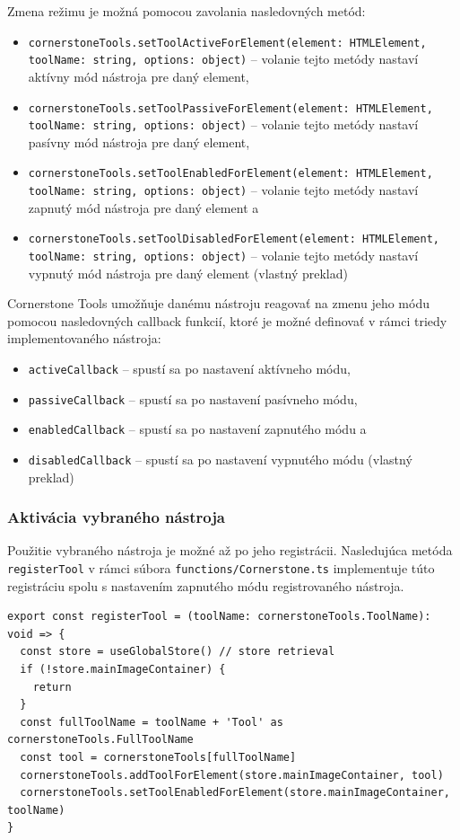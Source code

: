 Zmena režimu je možná pomocou zavolania nasledovných metód:
\begin {itemize}
\item {\texttt{cornerstoneTools.setToolActiveForElement(element: HTMLElement, toolName: string, options: object)} -- volanie tejto metódy nastaví aktívny mód nástroja pre daný element,}
\item {\texttt{cornerstoneTools.setToolPassiveForElement(element: HTMLElement, toolName: string, options: object)} -- volanie tejto metódy nastaví pasívny mód nástroja pre daný element,}
\item {\texttt{cornerstoneTools.setToolEnabledForElement(element: HTMLElement, toolName: string, options: object)} -- volanie tejto metódy nastaví zapnutý mód nástroja pre daný element a}
\item {\texttt{cornerstoneTools.setToolDisabledForElement(element: HTMLElement, toolName: string, options: object)} -- volanie tejto metódy nastaví vypnutý mód nástroja pre daný element  \cite{cornerstone_tools_modes} (vlastný preklad)}
\end {itemize}

Cornerstone Tools umožňuje danému nástroju reagovať na zmenu jeho módu pomocou nasledovných callback funkcií, ktoré je možné definovať v rámci triedy implementovaného nástroja:
\begin {itemize}
\item {\texttt{activeCallback} -- spustí sa po nastavení aktívneho módu,}
\item {\texttt{passiveCallback} -- spustí sa po nastavení pasívneho módu,}
\item {\texttt{enabledCallback} -- spustí sa po nastavení zapnutého módu a}
\item {\texttt{disabledCallback} -- spustí sa po nastavení vypnutého módu  \cite{cornerstone_tools_modes} (vlastný preklad)}
\end {itemize}

\subsubsection {Aktivácia vybraného nástroja}
Použitie vybraného nástroja je možné až po jeho registrácii.
Nasledujúca metóda \texttt{registerTool} v rámci súbora \texttt{functions/Cornerstone.ts} implementuje  túto registráciu spolu s nastavením zapnutého módu registrovaného nástroja.

\begin{minipage}[]{\linewidth}
\begin{verbatim}
export const registerTool = (toolName: cornerstoneTools.ToolName): void => {
  const store = useGlobalStore() // store retrieval
  if (!store.mainImageContainer) {
    return
  }
  const fullToolName = toolName + 'Tool' as cornerstoneTools.FullToolName
  const tool = cornerstoneTools[fullToolName]
  cornerstoneTools.addToolForElement(store.mainImageContainer, tool)
  cornerstoneTools.setToolEnabledForElement(store.mainImageContainer, toolName)
}
\end{verbatim}
\end{minipage}

